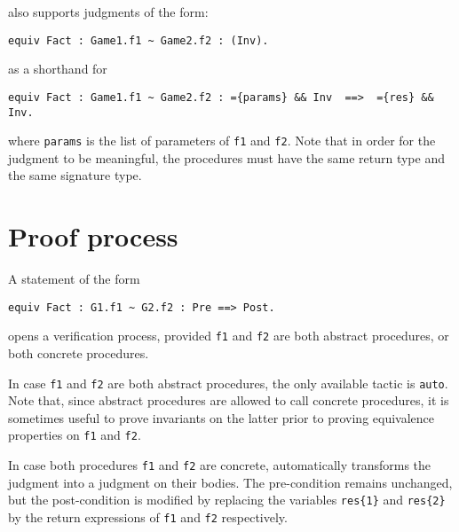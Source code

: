 \EasyCrypt also supports judgments of the form:
\begin{verbatim}
equiv Fact : Game1.f1 ~ Game2.f2 : (Inv).
\end{verbatim}
as a shorthand for 
\begin{verbatim}
equiv Fact : Game1.f1 ~ Game2.f2 : ={params} && Inv  ==>  ={res} && Inv.
\end{verbatim}
where \verb!params! is the list of parameters of \verb!f1! and
\verb!f2!. Note that in order for the judgment to be meaningful, the
procedures must have the same return type and the same signature type.






\section{Proof process}
A statement of the form 
\begin{verbatim}
equiv Fact : G1.f1 ~ G2.f2 : Pre ==> Post.
\end{verbatim}
opens a verification process, provided \verb!f1! and \verb!f2! are
both abstract procedures, or both concrete procedures. 


In case \verb!f1! and \verb!f2! are both abstract procedures, the only
available tactic is \verb!auto!. Note that, since abstract procedures
are allowed to call concrete procedures, it is sometimes useful to
prove invariants on the latter prior to proving equivalence properties
on \verb!f1! and \verb!f2!.


In case both procedures \verb!f1!  and \verb!f2! are concrete,
\EasyCrypt automatically transforms the judgment into a judgment on
their bodies. The pre-condition remains unchanged, but the
post-condition is modified by replacing the variables \verb+res{1}+
and \verb+res{2}+ by the return expressions of \verb!f1! and \verb!f2!
respectively.

